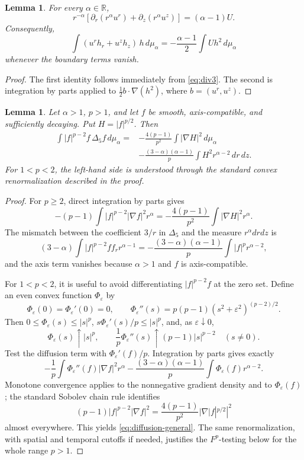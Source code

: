 \documentclass[11pt]{article}
\numberwithin{equation}{section}
\newtheorem{lemma}[theorem]{Lemma}
\theoremstyle{remark}
\newcommand{\R}{\mathbb R}
\newcommand{\Da}{\Delta_5}
\begin{document}
\begin{lemma}\label{lem:weighteddiv}
For every \(\alpha\in\R\),
\[
 r^{-\alpha}\left[\partial_r(r^\alpha u^r)+\partial_z(r^\alpha u^z)\right]
 = (\alpha-1)U.
\]
Consequently,
\[
 \int (u^r h_r+u^z h_z)\,h\,d\mu_\alpha
 =-\frac{\alpha-1}{2}\int U h^2\,d\mu_\alpha
\]
whenever the boundary terms vanish.
\end{lemma}

\begin{proof}
The first identity follows immediately from \eqref{eq:div3}.  The second is integration by parts applied to \(\frac12 b\cdot\nabla(h^2)\), where \(b=(u^r,u^z)\).
\end{proof}

\begin{lemma}\label{lem:diffusion}
Let \(\alpha>1\), \(p>1\), and let \(f\) be smooth, axis-compatible, and sufficiently decaying. Put \(H=|f|^{p/2}\). Then
\begin{align}
 \int |f|^{p-2}f\,\Da f\,d\mu_\alpha
 ={}&-\frac{4(p-1)}{p^2}\int |\nabla H|^2\,d\mu_\alpha\nonumber\\
 &-\frac{(3-\alpha)(\alpha-1)}p
 \int H^2 r^{\alpha-2}\,dr\,dz.\label{eq:diffusion-general}
\end{align}
For \(1<p<2\), the left-hand side is understood through the standard convex renormalization described in the proof.
\end{lemma}

\begin{proof}
For \(p\ge2\), direct integration by parts gives
\[
 -(p-1)\int |f|^{p-2}|\nabla f|^2r^\alpha
 =-\frac{4(p-1)}{p^2}\int|\nabla H|^2r^\alpha.
\]
The mismatch between the coefficient \(3/r\) in \(\Da\) and the measure \(r^\alpha drdz\) is
\[
 (3-\alpha)\int |f|^{p-2}ff_r r^{\alpha-1}
 =-\frac{(3-\alpha)(\alpha-1)}p\int |f|^p r^{\alpha-2},
\]
and the axis term vanishes because \(\alpha>1\) and \(f\) is axis-compatible.

For \(1<p<2\), it is useful to avoid differentiating \(|f|^{p-2}f\) at the zero set.  Define an even convex function \(\Phi_\varepsilon\) by
\[
 \Phi_\varepsilon(0)=\Phi_\varepsilon'(0)=0,
 \qquad
 \Phi_\varepsilon''(s)=p(p-1)(s^2+\varepsilon^2)^{(p-2)/2}.
\]
Then \(0\le \Phi_\varepsilon(s)\le |s|^p\),
\(s\Phi_\varepsilon'(s)/p\le |s|^p\), and, as \(\varepsilon\downarrow0\),
\[
 \Phi_\varepsilon(s)\uparrow |s|^p,
 \qquad
 \frac1p\Phi_\varepsilon''(s)\uparrow (p-1)|s|^{p-2}
 \quad (s\ne0).
\]
Test the diffusion term with \(\Phi_\varepsilon'(f)/p\). Integration by parts gives exactly
\[
 -\frac1p\int \Phi_\varepsilon''(f)|\nabla f|^2r^\alpha
 -\frac{(3-\alpha)(\alpha-1)}p
   \int \Phi_\varepsilon(f)r^{\alpha-2}.
\]
Monotone convergence applies to the nonnegative gradient density and to \(\Phi_\varepsilon(f)\); the standard Sobolev chain rule identifies
\[
 (p-1)|f|^{p-2}|\nabla f|^2
 =\frac{4(p-1)}{p^2}|\nabla |f|^{p/2}|^2
\]
almost everywhere. This yields \eqref{eq:diffusion-general}.  The same renormalization, with spatial and temporal cutoffs if needed, justifies the \(F^p\)-testing below for the whole range \(p>1\).
\end{proof}
\end{document}
